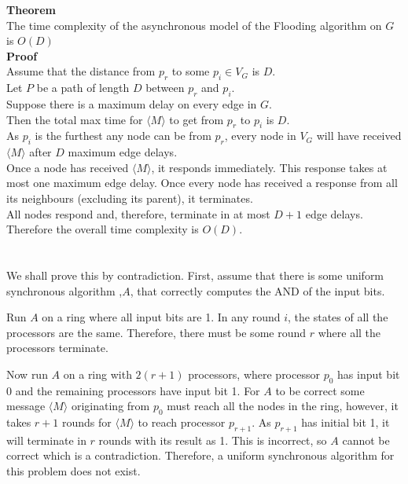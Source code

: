 \documentclass[11pt]{article}
\begin{document}
\textbf{Theorem}\\
The time complexity of the asynchronous model of the Flooding algorithm on $G$ is $O(D)$\\

\textbf{Proof}\\
Assume that the distance from $p_r$ to some $p_i \in V_G$ is $D$.\\
Let $P$ be a path of length $D$ between $p_r$ and $p_i$.\\
Suppose there is a maximum delay on every edge in $G$.\\
Then the total max time for $\langle M \rangle$ to get from $p_r$ to $p_i$ is $D$.\\
As $p_i$ is the furthest any node can be from $p_r$, every node in $V_G$ will have received $\langle M \rangle$ after $D$ maximum edge delays. \\
Once a node has received $\langle M \rangle$, it responds immediately. This response takes at most one maximum edge delay. Once every node has received a response from all its neighbours (excluding its parent), it terminates.\\
All nodes respond and, therefore, terminate in at most $D+1$ edge delays.\\
Therefore the overall time complexity is $O(D)$.

\newpage

\section{}

\subsection{}

We shall prove this by contradiction.
First, assume that there is some uniform synchronous algorithm ,$A$, that correctly computes the AND of the input bits. 

Run $A$ on a ring where all input bits are 1. In any round $i$, the states of all the processors are the same. Therefore, there must be some round $r$ where all the processors terminate.

Now run $A$ on a ring with $2(r+1)$ processors, where processor $p_0$ has input bit 0 and the remaining processors have input bit 1. For $A$ to be correct some message $\langle M \rangle$ originating from $p_0$ must reach all the nodes in the ring, however, it takes $r+1$ rounds for $\langle M \rangle$ to reach processor $p_{r+1}$. As $p_{r+1}$ has initial bit 1, it will terminate in $r$ rounds with its result as 1. This is incorrect, so $A$ cannot be correct which is a contradiction. Therefore, a uniform synchronous algorithm for this problem does not exist. 
\end{document}
